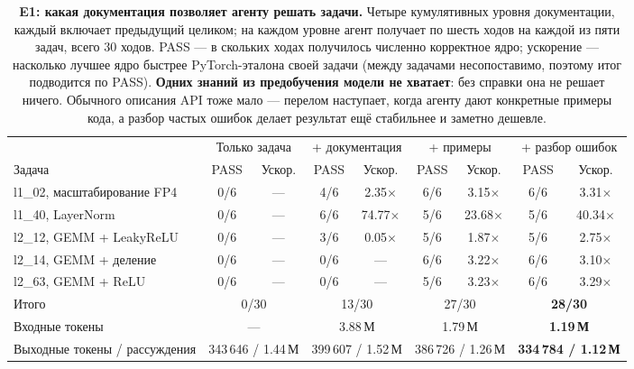 \documentclass[10pt,a4paper]{article}
\begin{document}
\begin{table}[h]
\centering\footnotesize
\caption{\textbf{E1: какая документация позволяет агенту решать задачи.} Четыре кумулятивных уровня
документации, каждый включает предыдущий целиком; на каждом уровне агент получает по шесть
ходов на каждой из пяти задач, всего 30 ходов. PASS --- в скольких ходах получилось численно
корректное ядро; ускорение --- насколько лучшее ядро быстрее PyTorch-эталона своей задачи
(между задачами несопоставимо, поэтому итог подводится по PASS). \textbf{Одних знаний из
предобучения модели не хватает}: без справки она не решает ничего. Обычного описания API тоже
мало --- перелом наступает, когда агенту дают конкретные примеры кода, а разбор частых ошибок
делает результат ещё стабильнее и заметно дешевле.}
\label{tab:e1}
\begin{tabular}{l cc cc cc cc}
\toprule
& \multicolumn{2}{c}{Только задача} & \multicolumn{2}{c}{+ документация}
& \multicolumn{2}{c}{+ примеры} & \multicolumn{2}{c}{+ разбор ошибок} \\
\cmidrule(lr){2-3}\cmidrule(lr){4-5}\cmidrule(lr){6-7}\cmidrule(lr){8-9}
Задача & PASS & Ускор. & PASS & Ускор. & PASS & Ускор. & PASS & Ускор. \\
\midrule
l1\_02, масштабирование FP4 & 0/6 & ---          & 4/6 & 2.35$\times$  & 6/6 & 3.15$\times$  & 6/6 & 3.31$\times$ \\
l1\_40, LayerNorm           & 0/6 & ---          & 6/6 & 74.77$\times$ & 5/6 & 23.68$\times$ & 5/6 & 40.34$\times$ \\
l2\_12, GEMM + LeakyReLU    & 0/6 & ---          & 3/6 & 0.05$\times$  & 5/6 & 1.87$\times$  & 5/6 & 2.75$\times$ \\
l2\_14, GEMM + деление      & 0/6 & ---          & 0/6 & ---           & 6/6 & 3.22$\times$  & 6/6 & 3.10$\times$ \\
l2\_63, GEMM + ReLU         & 0/6 & ---          & 0/6 & ---           & 5/6 & 3.23$\times$  & 6/6 & 3.29$\times$ \\
\midrule
Итого & \multicolumn{2}{c}{0/30} & \multicolumn{2}{c}{13/30}
      & \multicolumn{2}{c}{27/30} & \multicolumn{2}{c}{\textbf{28/30}} \\
Входные токены & \multicolumn{2}{c}{---} & \multicolumn{2}{c}{3.88\,М}
      & \multicolumn{2}{c}{1.79\,М} & \multicolumn{2}{c}{\textbf{1.19\,М}} \\
Выходные токены / рассуждения & \multicolumn{2}{c}{343\,646 / 1.44\,М} & \multicolumn{2}{c}{399\,607 / 1.52\,М}
      & \multicolumn{2}{c}{386\,726 / 1.26\,М} & \multicolumn{2}{c}{\textbf{334\,784 / 1.12\,М}} \\
\bottomrule
\end{tabular}
\end{table}
\end{document}
